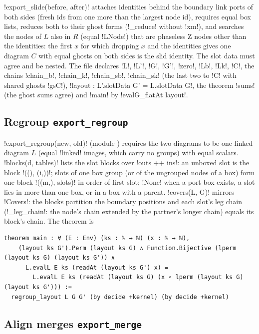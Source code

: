 {{{\lexpy!export_slide(before, after)! attaches identities behind the boundary link ports of both sides
(fresh ids from one more than the largest node id), requires equal box lists, reduces both to
their ghost forms (\lexpy!_reduce! without \lexcode!xm!), and searches the nodes of $L$ also in $R$
(equal \lexpy!LNode!) that are phaseless Z nodes other than the identities: the first $x$ for which
dropping $x$ and the identities gives one diagram $C$ with equal ghosts on both sides is the slid
identity. The slot data must agree and be nested. The file declares \lexlean!L!, \lexlean!L'!,
\lexlean!G!, \lexlean!G'!, \lexlean!zero!, \lexlean!Lb!, \lexlean!Lk!, \lexlean!C!, the chains \lexlean!chain_b!,
\lexlean!chain_k!, \lexlean!chain_sb!, \lexlean!chain_sk! (the last two to \lexlean!C! with shared ghosts
\lexlean!gsC!), \lexlean!layout : L'.slotData G' = L.slotData G!, the theorem \lexlean!sums! (the ghost
sums agree) and \lexlean!main! by \lexlean!evalG_flatAt layout!.

\subsection{Regroup \texttt{export\_regroup}}

\lexpy!export_regroup(new, old)! (module ) requires the two
diagrams to be one linked diagram $L$ (equal \lexpy!linked! images, which carry no groups) with equal
scalars. \lexpy!blocks(d, tables)! lists the slot blocks over \lexcode!outs ++ ins!: an unboxed slot is
the block \lexcode!((), (i,))!; slots of one box group (or of the ungrouped nodes of a box) form one
block \lexcode!((m,), slots)! in order of first slot; \lexpy!None! when a port box exists, a slot lies
in more than one box, or in a box with a parent. \lexpy!covers(L, G)! mirrors \lexlean!Covers!: the
blocks partition the boundary positions and each slot's leg chain (\lexpy!_leg_chain!: the node's
chain extended by the partner's longer chain) equals its block's chain. The theorem is
\begin{lstlisting}[style=lexlean]
theorem main : ∀ (E : Env) (ks : ℕ → ℕ) (x : ℕ → ℕ),
    (layout ks G').Perm (layout ks G) ∧ Function.Bijective (lperm (layout ks G) (layout ks G')) ∧
      L.evalL E ks (readAt (layout ks G') x) =
        L.evalL E ks (readAt (layout ks G) (x ∘ lperm (layout ks G) (layout ks G'))) :=
  regroup_layout L G G' (by decide +kernel) (by decide +kernel)
\end{lstlisting}

\subsection{Align merges \texttt{export\_merge}}\label{sec:lean-export-merge}

}}}
